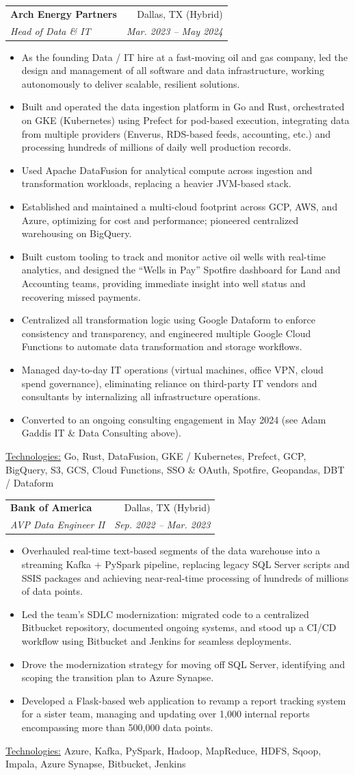 \documentclass[11pt, a4paper]{article}
\makeatletter
\newcommand{\resumeItem}[1]{%
  \item\small{
    #1
  }
}
\newcommand{\resumeSubheading}[4]{
  \vspace{8pt}\item%
    \begin{tabular*}{0.97\textwidth}[t]{l@{\extracolsep{\fill}}r}
      \textbf{#1} & #2 \\
      \textit{\small#3} & \textit{\small #4} \\
    \end{tabular*}\vspace{-5pt}
}
\newcommand{\resumeItemListStart}{\begin{itemize}}
\newcommand{\resumeItemListEnd}{\end{itemize}\vspace{-5pt}}
\newcommand{\resumeTech}[2]{
 \underline{#1:} #2
}
\makeatother
\begin{document}
\resumeSubheading
  {Arch Energy Partners}{Dallas, TX (Hybrid)}
  {Head of Data \& IT}{Mar. 2023 – May 2024}
  \resumeItemListStart
    \resumeItem{As the founding Data / IT hire at a fast-moving oil and gas company, led the design and management of all software and data infrastructure, working autonomously to deliver scalable, resilient solutions.}
    \resumeItem{Built and operated the data ingestion platform in Go and Rust, orchestrated on GKE (Kubernetes) using Prefect for pod-based execution, integrating data from multiple providers (Enverus, RDS-based feeds, accounting, etc.) and processing hundreds of millions of daily well production records.}
    \resumeItem{Used Apache DataFusion for analytical compute across ingestion and transformation workloads, replacing a heavier JVM-based stack.}
    \resumeItem{Established and maintained a multi-cloud footprint across GCP, AWS, and Azure, optimizing for cost and performance; pioneered centralized warehousing on BigQuery.}
    \resumeItem{Built custom tooling to track and monitor active oil wells with real-time analytics, and designed the ``Wells in Pay'' Spotfire dashboard for Land and Accounting teams, providing immediate insight into well status and recovering missed payments.}
    \resumeItem{Centralized all transformation logic using Google Dataform to enforce consistency and transparency, and engineered multiple Google Cloud Functions to automate data transformation and storage workflows.}
    \resumeItem{Managed day-to-day IT operations (virtual machines, office VPN, cloud spend governance), eliminating reliance on third-party IT vendors and consultants by internalizing all infrastructure operations.}
    \resumeItem{Converted to an ongoing consulting engagement in May 2024 (see Adam Gaddis IT \& Data Consulting above).}
\resumeItemListEnd
\resumeTech{Technologies}{Go, Rust, DataFusion, GKE / Kubernetes, Prefect, GCP, BigQuery, S3, GCS, Cloud Functions, SSO \& OAuth, Spotfire, Geopandas, DBT / Dataform}



\resumeSubheading
      {Bank of America}{Dallas, TX (Hybrid)}
      {AVP Data Engineer II}{Sep. 2022 – Mar. 2023}
      \resumeItemListStart
      \resumeItem{Overhauled real-time text-based segments of the data warehouse into a streaming Kafka + PySpark pipeline, replacing legacy SQL Server scripts and SSIS packages and achieving near-real-time processing of hundreds of millions of data points.}
      \resumeItem{Led the team's SDLC modernization: migrated code to a centralized Bitbucket repository, documented ongoing systems, and stood up a CI/CD workflow using Bitbucket and Jenkins for seamless deployments.}
      \resumeItem{Drove the modernization strategy for moving off SQL Server, identifying and scoping the transition plan to Azure Synapse.}
      \resumeItem{Developed a Flask-based web application to revamp a report tracking system for a sister team, managing and updating over 1{,}000 internal reports encompassing more than 500{,}000 data points.}
\resumeItemListEnd
\resumeTech{Technologies}{Azure, Kafka, PySpark, Hadoop, MapReduce, HDFS, Sqoop, Impala, Azure Synapse, Bitbucket, Jenkins}
\end{document}
